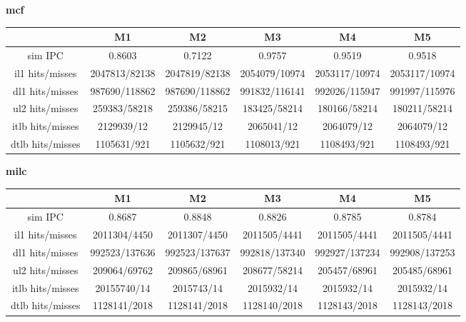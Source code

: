 \documentclass[10pt]{article} %
\begin{document}
\begin{enumerate}
\textbf{mcf}
\begin{center}
\begin{tabular}{| c | c | c | c | c | c |}
\hline
 & M1 & M2 & M3 & M4 & M5 \\
\hline
sim IPC & 0.8603 & 0.7122 & 0.9757 & 0.9519 & 0.9518 \\
il1 hits/misses & 2047813/82138 & 2047819/82138 & 2054079/10974 & 2053117/10974 & 2053117/10974 \\
dl1 hits/misses & 987690/118862 & 987690/118862 & 991832/116141 & 992026/115947 & 991997/115976 \\
ul2 hits/misses & 259383/58218 & 259386/58215 & 183425/58214 & 180166/58214 & 180211/58214 \\
itlb hits/misses & 2129939/12 & 2129945/12 & 2065041/12 & 2064079/12 & 2064079/12 \\
dtlb hits/misses & 1105631/921 & 1105632/921 & 1108013/921 & 1108493/921 & 1108493/921 \\
\hline
\end{tabular}
\end{center}

\textbf{milc}
\begin{center}
\begin{tabular}{| c | c | c | c | c | c |}
\hline
 & M1 & M2 & M3 & M4 & M5 \\
\hline
sim IPC & 0.8687 & 0.8848 & 0.8826 & 0.8785 & 0.8784 \\
il1 hits/misses & 2011304/4450 & 2011307/4450 & 2011505/4441 & 2011505/4441 & 2011505/4441 \\
dl1 hits/misses & 992523/137636 & 992523/137637 & 992818/137340 & 992927/137234 & 992908/137253 \\
ul2 hits/misses & 209064/69762 & 209865/68961 & 208677/58214 & 205457/68961 & 205485/68961 \\
itlb hits/misses & 20155740/14 & 2015743/14 & 2015932/14 & 2015932/14 & 2015932/14 \\
dtlb hits/misses & 1128141/2018 & 1128141/2018 & 1128140/2018 & 1128143/2018 & 1128143/2018 \\
\hline
\end{tabular}
\end{center}


\end{enumerate}
\end{document}
